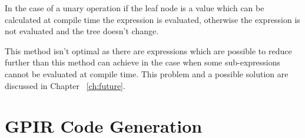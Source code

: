 In the case of a unary operation if the leaf node is a value which can be calculated
at compile time the expression is evaluated, otherwise the expression is not evaluated
and the tree doesn't change.

This method isn't optimal as there are expressions which are possible to
reduce further than this method can achieve in the case when some sub-expressions
cannot be evaluated at compile time. This problem and a possible solution
are discussed in Chapter ~\ref{ch:future}.

\section{GPIR Code Generation}





